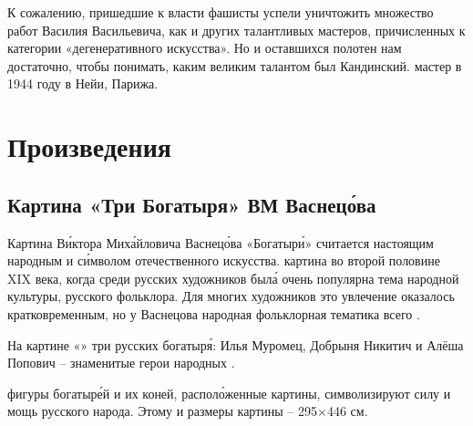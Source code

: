 К сожалению, пришедшие к власти фашисты успели уничтожить множество работ Василия Васильевича, как и других талантливых мастеров, причисленных к категории «дегенеративного искусства». Но и оставшихся полотен нам достаточно, чтобы понимать, каким великим талантом был Кандинский.  мастер в 1944 году в Нейи,  Парижа.


\section{Произведения}
\subsection{Картина «Три Богатыря» ВМ Васнец\'{о}ва}

Картина В\'{и}ктора Мих\'{а}йловича Васнец\'{о}ва «Богатыр\'{и}»  считается настоящим народным  и с\'{и}мволом отечественного искусства.  картина во второй половине XIX века, когда среди русских художников был\'{а} очень популярна тема народной культуры, русского фольклора. Для многих художников это увлечение оказалось кратковременным, но у Васнецова народная фольклорная тематика   всего .

На картине «»  три русских богатыр\'{я}: Илья Муромец, Добрыня Никитич и Алёша Попович -- знаменитые герои народных .

 фигуры богатыр\'{е}й и их коней, распол\'{о}женные  картины, символизируют силу и мощь русского народа. Этому   и  размеры картины -- 295$\times$446 см.

